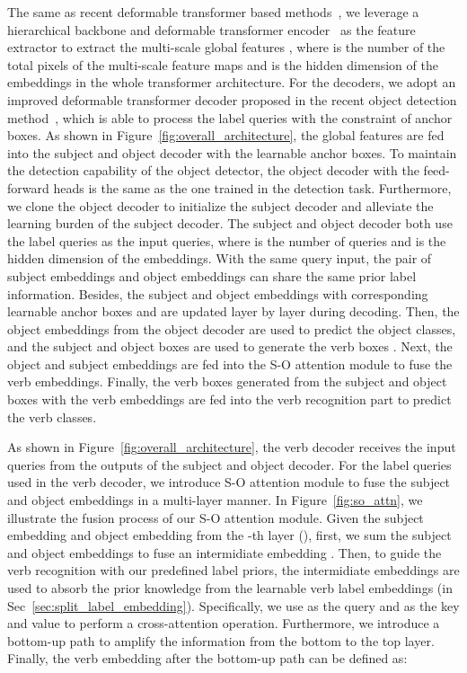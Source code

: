 \documentclass[10pt,twocolumn,letterpaper]{article}
\begin{document}
\quad The same as recent deformable transformer based methods~\cite{cjw_qahoi,Kim_2022_CVPR,ma2023fgahoi}, we leverage a hierarchical backbone and deformable transformer encoder~\cite{zhu2020deformable} as the feature extractor to extract the multi-scale global features , where  is the number of the total pixels of the multi-scale feature maps and  is the hidden dimension of the embeddings in the whole transformer architecture.
For the decoders, we adopt an improved deformable transformer decoder proposed in the recent object detection method~\cite{liu2022dabdetr}, which is able to process the label queries with the constraint of anchor boxes.
As shown in Figure~\ref{fig:overall_architecture}, the global features are fed into the subject and object decoder with the learnable anchor boxes.
To maintain the detection capability of the object detector, the object decoder with the feed-forward heads is the same as the one trained in the detection task.
Furthermore, we clone the object decoder to initialize the subject decoder and alleviate the learning burden of the subject decoder.
The subject and object decoder both use the label queries  as the input queries, where  is the number of queries and  is the hidden dimension of the embeddings.
With the same query input, the pair of subject embeddings  and object embeddings  can share the same prior label information.
Besides, the subject and object embeddings with corresponding learnable anchor boxes  and  are updated layer by layer during decoding.
Then, the object embeddings from the object decoder are used to predict the object classes, and the subject and object boxes are used to generate the verb boxes .
Next, the object and subject embeddings are fed into the S-O attention module to fuse the verb embeddings.
Finally, the verb boxes generated from the subject and object boxes with the verb embeddings are fed into the verb recognition part to predict the verb classes.

\quad As shown in Figure~\ref{fig:overall_architecture}, the verb decoder receives the input queries from the outputs of the subject and object decoder.
For the label queries used in the verb decoder, we introduce S-O attention module to fuse the subject and object embeddings in a multi-layer manner.
In Figure~\ref{fig:so_attn}, we illustrate the fusion process of our S-O attention module.
Given the subject embedding  and object embedding  from the -th layer (), first, we sum the subject and object embeddings to fuse an intermidiate embedding .
Then, to guide the verb recognition with our predefined label priors, the intermidiate embeddings  are used to absorb the prior knowledge from the learnable verb label embeddings  (in Sec~\ref{sec:split_label_embedding}).
Specifically, we use  as the query and  as the key and value to perform a cross-attention operation.
Furthermore, we introduce a bottom-up path to amplify the information from the bottom to the top layer.
Finally, the verb embedding  after the bottom-up path can be defined as:
\end{document}
